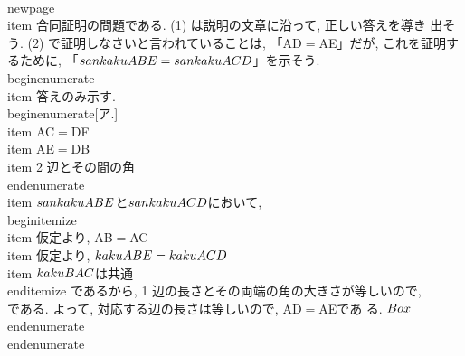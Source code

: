  \\newpage
 \\item 合同証明の問題である. (1) は説明の文章に沿って, 正しい答えを導き
       出そう. (2) で証明しなさいと言われていることは, 「AD$=$AE」だが,
       これを証明するために, 「$\\sankaku{ABE}=\\sankaku{ACD}$」を示そう.
       \\begin{enumerate}
	\\item 答えのみ示す.
	      \\begin{enumerate}[ア.]
	       \\item AC$=$DF
	       \\item AE$=$DB
	       \\item 2 辺とその間の角
	      \\end{enumerate}
	\\item $\\sankaku{ABE}$と$\\sankaku{ACD}$において,
	      \\begin{itemize}
	       \\item 仮定より, AB$=$AC
	       \\item 仮定より, $\\kaku{ABE}=\\kaku{ACD}$
	       \\item $\\kaku{BAC}$は共通
	      \\end{itemize}
	      であるから, 1 辺の長さとその両端の角の大きさが等しいので,
	      \\[
	       \\sankaku{ABE}\\equiv\\sankaku{ACD}
	      \\]
	      である. よって, 対応する辺の長さは等しいので, AD$=$AEであ
	      る. $\\Box$
       \\end{enumerate}
\\end{enumerate}
